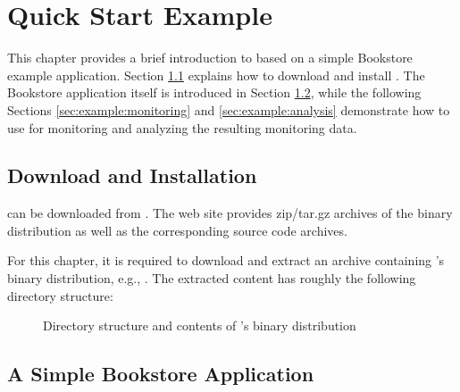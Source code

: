\chapter{Quick Start Example}

This chapter provides a brief introduction to \Kieker{} based on a simple Bookstore example application. %
Section \ref{sec:example:downloadInstall} explains how to download and install \Kieker{}. The Bookstore application itself is introduced in Section \ref{sec:example:bookstore}, while the following Sections \ref{sec:example:monitoring} and \ref{sec:example:analysis} demonstrate how to use \Kieker{} for monitoring and analyzing the resulting monitoring data.

\section{Download and Installation}\label{sec:example:downloadInstall}

\Kieker{} can be downloaded from \KiekerURL. The web site provides zip/tar.gz archives of the \Kieker{} binary distribution as well as the corresponding \Kieker{} source code archives.

For this chapter, it is required to download and extract an archive containing \Kieker's binary distribution, e.g., \file{\binaryFileForDownload}. The extracted content has roughly the following directory structure:
\begin{figure}[H]
\begin{graybox}
\end{graybox}
\caption{Directory structure and contents of \Kieker{}'s binary distribution}
\end{figure}

\section{A Simple Bookstore Application}\label{sec:example:bookstore}


